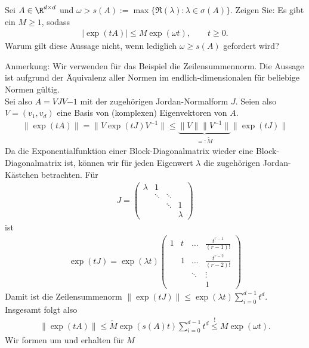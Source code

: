 \begin{exercise}
Sei $A \in \R^{d \times d}$ und $\omega > s(A) := \max \{\Re(\lambda): \lambda \in \sigma(A)\}$.
Zeigen Sie: Es gibt ein $M \geq 1$, sodass
\begin{align*}
  |\exp(tA)| \leq M\exp(\omega t), \qquad t \geq 0.
\end{align*}
Warum gilt diese Aussage nicht, wenn lediglich $\omega \geq s(A)$ gefordert wird?
\end{exercise}
\begin{solution}
Anmerkung: Wir verwenden für das Beispiel die Zeilensummennorm. Die Aussage ist
aufgrund der Äquivalenz aller Normen im endlich-dimensionalen für beliebige Normen gültig. \\
Sei also $A = VJV{-1}$ mit der zugehörigen Jordan-Normalform $J$.
Seien also $V = (v_1,v_d)$ eine Basis von (komplexen) Eigenvektoren von $A$.
\begin{align*}
  \|\exp(tA)\| = \|V\exp(tJ)V^{-1}\| \leq \underbrace{\|V\|\|V^{-1}\|}_{=:\widetilde{M}}\|\exp(tJ)\|
\end{align*}
Da die Exponentialfunktion einer Block-Diagonalmatrix wieder eine Block-Diagonalmatrix ist,
können wir für jeden Eigenwert $\lambda$ die zugehörigen Jordan-Kästchen betrachten.
Für
\begin{align*}
  J = \begin{pmatrix}
    \lambda & 1 & & \\
    & \ddots & \ddots & \\
    & & \ddots & 1 \\
    & & & \lambda
  \end{pmatrix}
\end{align*}
ist
\begin{align*}
  \exp(tJ) = \exp(\lambda t)\begin{pmatrix}
    1 & t & \dots & \frac{t^{r-1}}{(r-1)!} \\
    & 1 & \dots & \frac{t^{r-2}}{(r-2)!} \\
    & & \ddots & \vdots \\
    & & & 1
  \end{pmatrix}
\end{align*}
Damit ist die Zeilensummenorm  $\|\exp(tJ)\| \leq \exp(\lambda t)\sum_{i=0}^{d-1} t^d$.
Insgesamt folgt also
\begin{align*}
  \|\exp(tA)\| \leq \widetilde{M}\exp(s(A)t)\sum_{i=0}^{d-1} t^d \stackrel{!}{\leq} M \exp(\omega t).
\end{align*}
Wir formen um und erhalten für $M$
\begin{align*}

\end{align*}
\end{solution}
